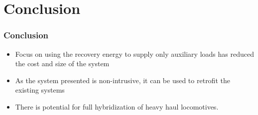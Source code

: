 \documentclass[aspectratio=169]{beamer}
\begin{document}
\section{Conclusion}
\begin{frame}
	\frametitle{Conclusion}
	\begin{itemize}
		\item  Focus on
		using the recovery energy to supply only auxiliary loads has reduced the cost and size of the system
		\item As the system presented is non-intrusive, it can be used to retrofit the existing systems
		\item There is potential for full hybridization of heavy haul locomotives.
	\end{itemize}
	
\end{frame}
\end{document}
